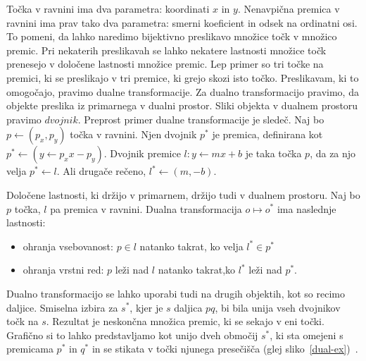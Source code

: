 \documentclass[a4paper, 12pt]{book}
\begin{document}
Točka v ravnini ima dva parametra: koordinati $x$ in $y$. Nenavpična premica v ravnini ima prav tako dva parametra: smerni koeficient in odsek na ordinatni osi. To pomeni, da lahko naredimo bijektivno preslikavo množice točk v množico premic. Pri nekaterih preslikavah se lahko nekatere lastnosti množice točk prenesejo v določene lastnosti množice premic. Lep primer so tri točke na premici, ki se preslikajo v tri premice, ki grejo skozi isto točko. Preslikavam, ki to omogočajo, pravimo dualne transformacije. Za dualno transformacijo pravimo, da objekte preslika iz primarnega v dualni prostor. Sliki objekta v dualnem prostoru pravimo $dvojnik$. Preprost primer dualne transformacije je sledeč. Naj bo $p \gets (p_x, p_y)$ točka v ravnini. Njen dvojnik $p^*$ je premica, definirana kot $p^* \gets (y \gets p_xx - p_y)$. Dvojnik premice $l: y \gets mx + b$ je taka točka $p$, da za njo velja $p^* \gets l$. Ali drugače rečeno, $l^* \gets (m, -b)$.  

Določene lastnosti, ki držijo v primarnem, držijo tudi v  dualnem prostoru. Naj bo $p$ točka, $l$ pa premica v ravnini. Dualna transformacija $o \mapsto o^*$ ima naslednje lastnosti:
\begin{itemize}
\item ohranja vsebovanost: $p\in l$ natanko takrat, ko velja $l^*\in p^*$
\item ohranja vrstni red: $p$ leži nad $l$ natanko takrat,ko $l^*$ leži nad $p^*$.  
\end{itemize}

Dualno transformacijo se lahko uporabi tudi na drugih objektih, kot so recimo daljice. Smiselna izbira za $s^*$, kjer je $s$ daljica $pq$, bi bila unija vseh dvojnikov točk na $s$. Rezultat je neskončna množica premic, ki se sekajo v eni točki. Grafično si to lahko predstavljamo kot unijo dveh območij $s^*$, ki sta omejeni s premicama $p^*$ in $q^*$ in se stikata v točki njunega presečišča (glej sliko~\ref{dual-ex})~\cite{bkos-08-dual}.
\end{document}
